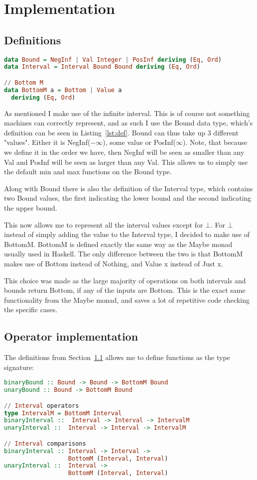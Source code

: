 \section{Implementation}

\subsection{Definitions}\label{sec:def}
\begin{lstlisting}[language={haskell}, caption={Bound data type}, label={lst:def}]
data Bound = NegInf | Val Integer | PosInf deriving (Eq, Ord)
data Interval = Interval Bound Bound deriving (Eq, Ord)

// Bottom M
data BottomM a = Bottom | Value a
  deriving (Eq, Ord)
\end{lstlisting}
As mentioned I make use of the infinite interval. This is of course not
something machines can correctly represent, and as such I use the Bound data
type, which's definition can be seen in Listing~\ref{lst:def}. Bound can thus
take up 3 different "values". Either it is NegInf($-\infty$), some value or
PosInf($\infty$). Note, that because we define it in the order we have, then
NegInf will be seen as smaller than any Val and PosInf will be seen as larger
than any Val. This allows us to simply use the default min and max functions on
the Bound type.

Along with Bound there is also the definition of the Interval type, which
contains two Bound values, the first indicating the lower bound and the second
indicating the upper bound.

This now allows me to represent all the interval values except for $\bot$. For
$\bot$ instead of simply adding the value to the Interval type, I decided to
make use of BottomM. BottomM is defined exactly the same way as the Maybe monad
usually used in Haskell. The only difference between the two is that BottomM
makes use of Bottom instead of Nothing, and Value x instead of Just x.

This choice was made as the large majority of operations on both intervals and
bounds return Bottom, if any of the inputs are Bottom. This is the exact same
functionality from the Maybe monad, and saves a lot of repetitive code checking
the specific cases.

\subsection{Operator implementation}
The definitions from Section~\ref{sec:def} allows me to define functions as the type signature:
\begin{lstlisting}[language={haskell}]
binaryBound :: Bound -> Bound -> BottomM Bound
unaryBound :: Bound -> BottomM Bound

// Interval operators
type IntervalM = BottomM Interval
binaryInterval ::  Interval -> Interval -> IntervalM
unaryInterval ::  Interval -> Interval -> IntervalM

// Interval comparisons
binaryInterval :: Interval -> Interval -> 
                  BottomM (Interval, Interval)
unaryInterval ::  Interval -> 
                  BottomM (Interval, Interval)
\end{lstlisting}

